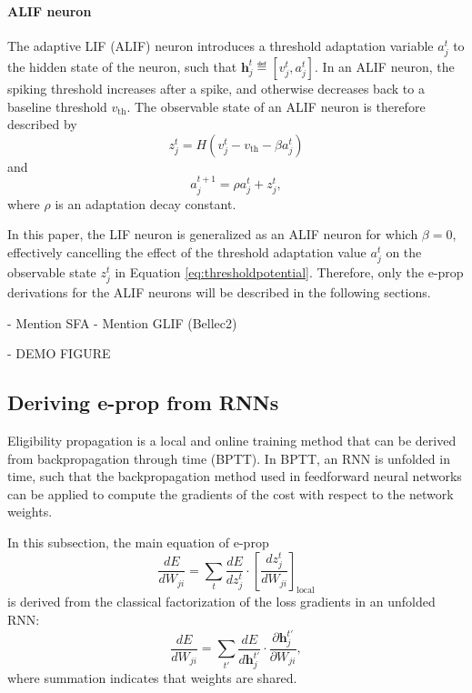         \paragraph{ALIF neuron}
        The adaptive LIF (ALIF) neuron introduces a threshold adaptation variable $a^t_j$ to the hidden state of the neuron, such that $\mathbf{h}^t_j \eqdef \left[v^t_j, a^t_j\right]$.
        In an ALIF neuron, the spiking threshold increases after a spike, and otherwise decreases back to a baseline threshold $v_\text{th}$.
        The observable state of an ALIF neuron is therefore described by
        \begin{equation}\label{eq:alifZ}
        z^t_j = H\left(v_j^t - v_\text{th} - \beta a^t_j\right)
        \end{equation}
        and
        \begin{equation}\label{eq:alifA}
        a^{t+1}_j = \rho a^t_j + z^t_j,
        \end{equation}
        where $\rho$ is an adaptation decay constant.

        In this paper, the LIF neuron is generalized as an ALIF neuron for which $\beta=0$, effectively cancelling the effect of the threshold adaptation value $a^t_j$ on the observable state $z^t_j$ in Equation \ref{eq:thresholdpotential}.
        Therefore, only the e-prop derivations for the ALIF neurons will be described in the following sections.

        \begin{tcolorbox}[colback=orange]
        - Mention SFA
          - Mention GLIF (Bellec2)

        \end{tcolorbox}
        \begin{tcolorbox}[colback=orange]
        - DEMO FIGURE

        \end{tcolorbox}

    \subsection{Deriving e-prop from RNNs}\label{sec:derivefromBPTT}
        Eligibility propagation is a local and online training method that can be derived from backpropagation through time (BPTT).
        In BPTT, an RNN is unfolded in time, such that the backpropagation method used in feedforward neural networks can be applied to compute the gradients of the cost with respect to the network weights.

        In this subsection, the main equation of e-prop
        \begin{equation}
        \frac{dE}{dW_{ji}} =
        \sum_t\frac{dE}{dz_j^t}\cdot\left[\frac{dz_j^t}{dW_{ji}}\right]_\text{local}
        \end{equation}
        is derived from the classical factorization of the loss gradients in an unfolded RNN:
        \begin{equation}\label{eq:clafac}
        \frac{dE}{dW_{ji}} = \sum_{t'}\frac{dE}{d\mathbf{h}_j^{t'}}\cdot\frac{\partial \mathbf{h}_j^{t'}}{\partial W_{ji}},
        \end{equation}
        where summation indicates that weights are shared.

